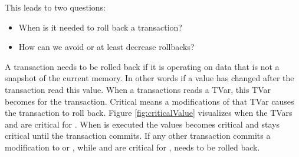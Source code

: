 This leads to two questions:
\begin{itemize}
 \item When is it needed to roll back a transaction?
 \item How can we avoid or at least decrease rollbacks?
\end{itemize}
A transaction needs to be rolled back if it is operating on data that is not a snapshot of the current memory. In other words 
if a value has changed after the transaction read this value. When a transactions reads a TVar, this TVar becomes 
 for the transaction. Critical means a modifications of that TVar causes the transaction to roll back.
Figure \ref{fig:criticalValue} visualizes when the TVars  and  are critical for .
When  is executed the values becomes critical and stays critical until the transaction commits.
If any other transaction commits a modification to  or , while  and  are
critical for ,  needs to be rolled back.




